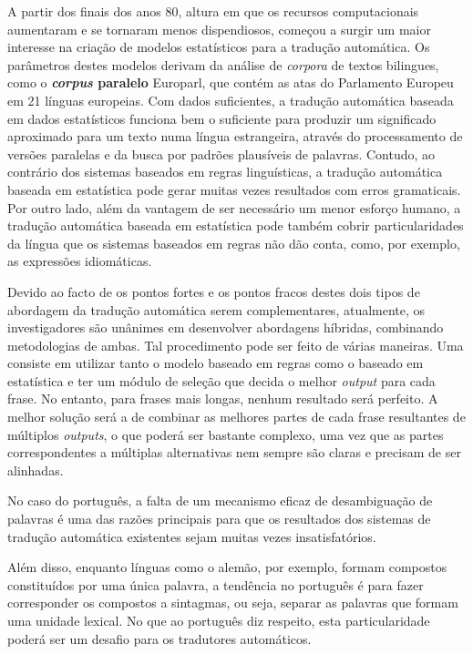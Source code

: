 \begin{multicols}{2}
A partir dos finais dos anos 80, altura em que os recursos computacionais aumentaram e se tornaram menos dispendiosos, começou a surgir um maior interesse na criação de modelos estatísticos para a tradução automática. Os parâmetros destes modelos derivam da análise de \textit{corpora} de textos bilingues, como o \textbf{\textit{corpus} paralelo} Europarl, que contém as atas do Parlamento Europeu em 21 línguas europeias. Com dados suficientes, a tradução automática baseada em dados estatísticos funciona bem o suficiente para produzir um significado aproximado para um texto numa língua estrangeira, através do processamento de versões paralelas e da busca por padrões plausíveis de palavras. Contudo, ao contrário dos sistemas baseados em regras linguísticas, a tradução automática baseada em estatística pode gerar muitas vezes resultados com erros gramaticais. Por outro lado, além da vantagem de ser necessário um menor esforço humano, a tradução automática baseada em estatística pode também cobrir particularidades da língua que os sistemas baseados em regras não dão conta, como, por exemplo, as expressões idiomáticas.

Devido ao facto de os pontos fortes e os pontos fracos destes dois tipos de abordagem da tradução automática serem complementares, atualmente, os investigadores são unânimes em desenvolver abordagens híbridas, combinando metodologias de ambas. Tal procedimento pode ser feito de várias maneiras. Uma consiste em utilizar tanto o modelo baseado em regras como o baseado em estatística e ter um módulo de seleção que decida o melhor \textit{output} para cada frase. No entanto, para frases mais longas, nenhum resultado será perfeito. A melhor solução será a de combinar as melhores partes de cada frase resultantes de múltiplos \textit{outputs}, o que poderá ser bastante complexo, uma vez que as partes cor\-res\-pon\-den\-tes a múltiplas alternativas nem sempre são claras e precisam de ser alinhadas.

No caso do português, a falta de um mecanismo eficaz de desambiguação de palavras é uma das razões principais para que os resultados dos sistemas de tradução automática existentes sejam muitas vezes insatisfatórios.

Além disso, enquanto línguas como o alemão, por exemplo, formam compostos constituídos por uma única palavra, a tendência no português é para fazer corresponder os compostos a sintagmas, ou seja, separar as palavras que formam uma unidade lexical. No que ao português diz respeito, esta particularidade poderá ser um desafio para os tradutores automáticos.


\end{multicols}

